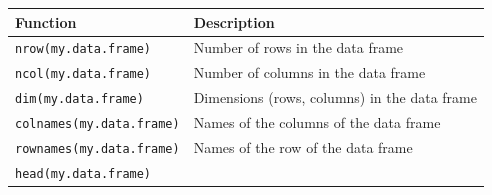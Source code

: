 \documentclass[]{book}
\theoremstyle{definition}
\theoremstyle{definition}
\theoremstyle{remark}
\begin{document}
\begin{longtable}[]{@{}ll@{}}
\toprule
\begin{minipage}[b]{0.07\columnwidth}\raggedright\strut
Function\strut
\end{minipage} & \begin{minipage}[b]{0.88\columnwidth}\raggedright\strut
Description\strut
\end{minipage}\tabularnewline
\midrule
\endhead
\begin{minipage}[t]{0.07\columnwidth}\raggedright\strut
\texttt{nrow(my.data.frame)}\strut
\end{minipage} & \begin{minipage}[t]{0.88\columnwidth}\raggedright\strut
Number of rows in the data frame\strut
\end{minipage}\tabularnewline
\begin{minipage}[t]{0.07\columnwidth}\raggedright\strut
\texttt{ncol(my.data.frame)}\strut
\end{minipage} & \begin{minipage}[t]{0.88\columnwidth}\raggedright\strut
Number of columns in the data frame\strut
\end{minipage}\tabularnewline
\begin{minipage}[t]{0.07\columnwidth}\raggedright\strut
\texttt{dim(my.data.frame)}\strut
\end{minipage} & \begin{minipage}[t]{0.88\columnwidth}\raggedright\strut
Dimensions (rows, columns) in the data frame\strut
\end{minipage}\tabularnewline
\begin{minipage}[t]{0.07\columnwidth}\raggedright\strut
\texttt{colnames(my.data.frame)}\strut
\end{minipage} & \begin{minipage}[t]{0.88\columnwidth}\raggedright\strut
Names of the columns of the data frame\strut
\end{minipage}\tabularnewline
\begin{minipage}[t]{0.07\columnwidth}\raggedright\strut
\texttt{rownames(my.data.frame)}\strut
\end{minipage} & \begin{minipage}[t]{0.88\columnwidth}\raggedright\strut
Names of the row of the data frame\strut
\end{minipage}\tabularnewline
\begin{minipage}[t]{0.07\columnwidth}\raggedright\strut
\texttt{head(my.data.frame)}\strut
\end{minipage} & \begin{minipage}[t]{0.88\columnwidth}\raggedright\strut

\end{minipage}
\end{longtable}
\end{document}

